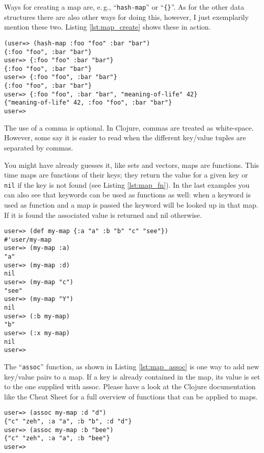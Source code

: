 Ways for creating a map are, e.\,g., ``\texttt{hash-map}'' or ``\texttt{\{\}}''.
As for the other data structures there are also other ways for doing this, however, I just exemplarily mention these two.
Listing \vref{lst:map_create} shows these in action.

\begin{lstlisting}[label=lst:map_create, caption=Create sets.]
(user=> (hash-map :foo "foo" :bar "bar")
{:foo "foo", :bar "bar"}
user=> {:foo "foo" :bar "bar"}
{:foo "foo", :bar "bar"}
user=> {:foo "foo", :bar "bar"}
{:foo "foo", :bar "bar"}
user=> {:foo "foo", :bar "bar", "meaning-of-life" 42}
{"meaning-of-life" 42, :foo "foo", :bar "bar"}
user=> 
\end{lstlisting}

The use of a comma is optional.
In Clojure, commas are treated as white-space.
However, some say it is easier to read when the different key/value tuples are separated by commas.

You might have already guesses it, like sets and vectors, maps are functions.
This time maps are functions of their keys; they return the value for a given key or \texttt{nil} if the key is not found (see Listing \vref{lst:map_fn}).
In the last examples you can also see that keywords can be used as functions as well:
when a keyword is used as function and a map is passed the keyword will be looked up in that map.
If it is found the associated value is returned and nil otherwise.

\begin{lstlisting}[label=lst:map_fn, caption=Look things up in a map.]
user=> (def my-map {:a "a" :b "b" "c" "see"})
#'user/my-map
user=> (my-map :a)
"a"
user=> (my-map :d)
nil
user=> (my-map "c")
"see"
user=> (my-map "Y")
nil
user=> (:b my-map)
"b"
user=> (:x my-map)
nil
user=> 
\end{lstlisting}

The ``\texttt{assoc}'' function, as shown in Listing \vref{lst:map_assoc} is one way to add new key/value pairs to a map.
If a key is already contained in the map, its value is set to the one supplied with assoc.
Please have a look at the Clojure documentation like the Cheat Sheet for a full overview of functions that can be applied to maps.

\begin{lstlisting}[label=lst:map_assoc, caption=Look things up in a map.]
user=> (assoc my-map :d "d")
{"c" "zeh", :a "a", :b "b", :d "d"}
user=> (assoc my-map :b "bee")
{"c" "zeh", :a "a", :b "bee"}
user=> 
\end{lstlisting}

